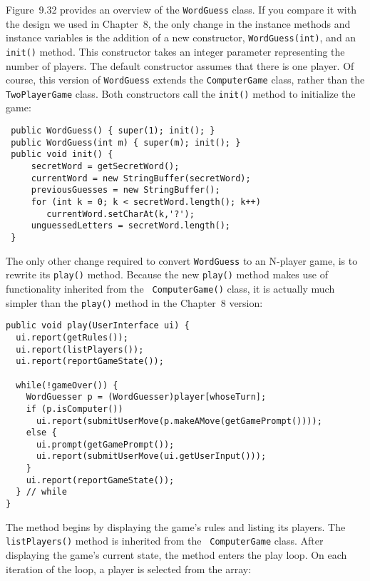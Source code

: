 Figure~9.32 provides an overview of the {\tt WordGuess} class.  If
you compare it with the design we used in Chapter~8, the only change
in the instance methods and instance variables is the addition of a
new constructor, {\tt WordGuess(int)}, and an {\tt init()} method.  This
constructor takes an integer parameter representing the number of
players. The default constructor assumes that there is one player.  Of
course, this version of {\tt WordGuess} extends the {\tt ComputerGame}
class, rather than the {\tt TwoPlayerGame} class.  Both constructors
call the {\tt init()} method to initialize the game:

\begin{jjjlisting}
\begin{lstlisting}
 public WordGuess() { super(1); init(); }
 public WordGuess(int m) { super(m); init(); } 
 public void init() {
     secretWord = getSecretWord();
     currentWord = new StringBuffer(secretWord);
     previousGuesses = new StringBuffer();
     for (int k = 0; k < secretWord.length(); k++)
        currentWord.setCharAt(k,'?');
     unguessedLetters = secretWord.length();
 }
\end{lstlisting}
\end{jjjlisting}

The only other change required to convert {\tt WordGuess} to an
N-player game, is to rewrite its {\tt play()} method.  Because the new
{\tt play()} method makes use of functionality inherited from the {\tt
ComputerGame()} class, it is actually much simpler than the {\tt play()}
method in the Chapter~8 version:

\begin{jjjlisting}[28pc]
\begin{lstlisting}
public void play(UserInterface ui) {
  ui.report(getRules());
  ui.report(listPlayers());
  ui.report(reportGameState());

  while(!gameOver()) {  
    WordGuesser p = (WordGuesser)player[whoseTurn];
    if (p.isComputer())
      ui.report(submitUserMove(p.makeAMove(getGamePrompt())));
    else {
      ui.prompt(getGamePrompt());
      ui.report(submitUserMove(ui.getUserInput()));
    }
    ui.report(reportGameState());
  } // while
}
\end{lstlisting}
\end{jjjlisting}

\noindent The method begins by displaying the game's rules and listing
its players. The {\tt listPlayers()} method is inherited from the {\tt
ComputerGame} class.  After displaying the game's current state, the
method enters the play loop. On each iteration of the loop, a
player is selected from the array:


